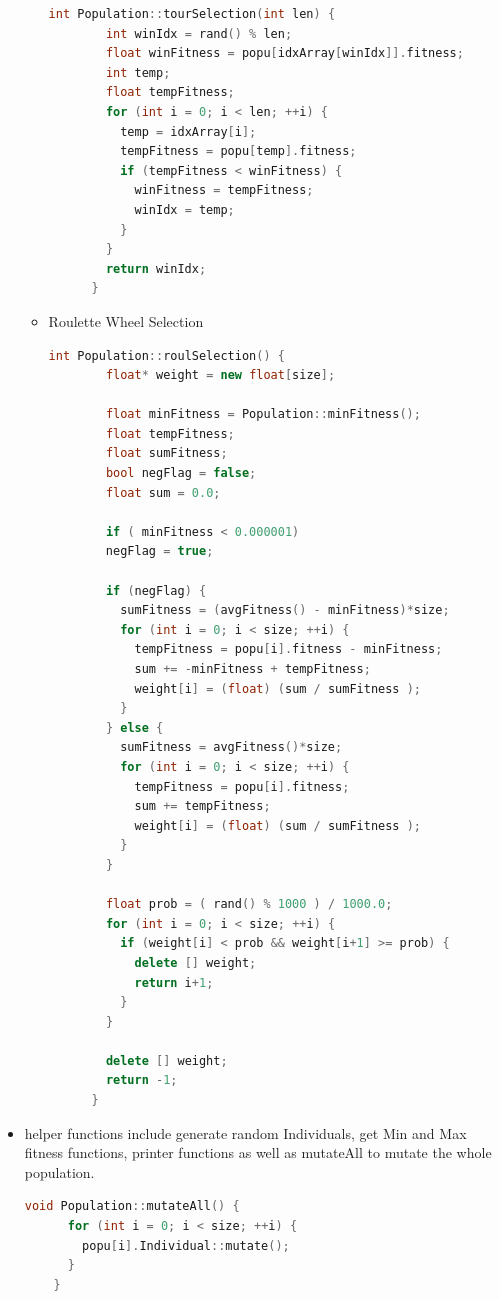 \documentclass{article}
\begin{document}
\begin{CJK}{UTF8}{gbsn}
\begin{itemize}
\begin{itemize}
\begin{lstlisting}[language=c++]
      int Population::tourSelection(int len) {
        int winIdx = rand() % len;
        float winFitness = popu[idxArray[winIdx]].fitness;
        int temp;
        float tempFitness;
        for (int i = 0; i < len; ++i) {
          temp = idxArray[i];
          tempFitness = popu[temp].fitness;
          if (tempFitness < winFitness) {
            winFitness = tempFitness;
            winIdx = temp;
          }
        }
        return winIdx;
      }
    \end{lstlisting}

  \item Roulette Wheel Selection
    \begin{lstlisting}[language=c++]
      int Population::roulSelection() {
        float* weight = new float[size];

        float minFitness = Population::minFitness();
        float tempFitness;
        float sumFitness;
        bool negFlag = false;
        float sum = 0.0;

        if ( minFitness < 0.000001)
        negFlag = true;

        if (negFlag) {
          sumFitness = (avgFitness() - minFitness)*size;
          for (int i = 0; i < size; ++i) {
            tempFitness = popu[i].fitness - minFitness;
            sum += -minFitness + tempFitness;
            weight[i] = (float) (sum / sumFitness );
          }
        } else {
          sumFitness = avgFitness()*size;
          for (int i = 0; i < size; ++i) {
            tempFitness = popu[i].fitness;
            sum += tempFitness;
            weight[i] = (float) (sum / sumFitness );
          }
        }

        float prob = ( rand() % 1000 ) / 1000.0;
        for (int i = 0; i < size; ++i) {
          if (weight[i] < prob && weight[i+1] >= prob) {
            delete [] weight;
            return i+1;
          }
        }

        delete [] weight;
        return -1;
      }
    \end{lstlisting}
  \end{itemize}

\item helper functions include generate random Individuals, get Min and Max fitness functions, printer functions as well as mutateAll to mutate the whole population.
  \begin{lstlisting}[language=c++]
    void Population::mutateAll() { 
      for (int i = 0; i < size; ++i) {
        popu[i].Individual::mutate();
      }
    }


\end{lstlisting}
\end{itemize}
\end{CJK}
\end{document}

